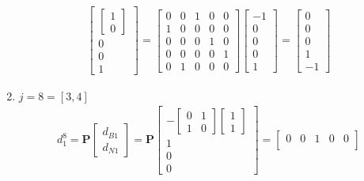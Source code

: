 \documentclass[11pt]{article}
\begin{document}
\begin{enumerate}
\begin{align*}
\begin{bmatrix}
        \begin{bmatrix}
            1 \\ 0
        \end{bmatrix} \\
        0 \\ 0 \\ 1
      \end{bmatrix}
      = 
      \begin{bmatrix}
        0 & 0 & 1 & 0 & 0 \\
        1 & 0 & 0 & 0 & 0 \\
        0 & 0 & 0 & 1 & 0 \\
        0 & 0 & 0 & 0 & 1 \\
        0 & 1 & 0 & 0 & 0
      \end{bmatrix}
      \begin{bmatrix}
        -1 \\ 0 \\ 0 \\ 0 \\ 1
      \end{bmatrix}
      =
      \begin{bmatrix}
        0 \\ 0 \\ 0 \\ 1 \\ -1
      \end{bmatrix}
    \end{align*}
    \item $j=8 = [3,4]$
    \begin{align*}
        d_1^8 = \textbf{P}
      \begin{bmatrix}
         d_{B1} \\ d_{N1}
      \end{bmatrix}
      =
      \textbf{P}
      \begin{bmatrix}
        -
        \begin{bmatrix}
         0 & 1 \\ 1 & 0   
        \end{bmatrix}
        \begin{bmatrix}
            1 \\ 1
        \end{bmatrix} \\
        1 \\ 0 \\ 0
      \end{bmatrix}
      = 
      \begin{bmatrix}
        0 & 0 & 1 & 0 & 0 \\

\end{bmatrix}
\end{align*}
\end{enumerate}
\end{document}
